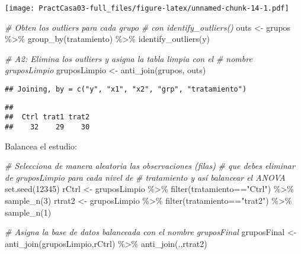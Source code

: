 \documentclass[
]{article}
\newenvironment{Shaded}{}{}
\newcommand{\CommentTok}[1]{\textcolor[rgb]{0.38,0.63,0.69}{\textit{#1}}}
\newcommand{\DecValTok}[1]{\textcolor[rgb]{0.25,0.63,0.44}{#1}}
\newcommand{\FunctionTok}[1]{\textcolor[rgb]{0.02,0.16,0.49}{#1}}
\newcommand{\NormalTok}[1]{#1}
\newcommand{\OtherTok}[1]{\textcolor[rgb]{0.00,0.44,0.13}{#1}}
\newcommand{\SpecialCharTok}[1]{\textcolor[rgb]{0.25,0.44,0.63}{#1}}
\newcommand{\StringTok}[1]{\textcolor[rgb]{0.25,0.44,0.63}{#1}}
\begin{document}
\texttt{[image: PractCasa03-full\_files/figure-latex/unnamed-chunk-14-1.pdf]}

\begin{Shaded}
\begin{Highlighting}[]
\CommentTok{\# Obten los outliers para cada grupo}
\CommentTok{\# con identify\_outliers()}
\NormalTok{outs }\OtherTok{\textless{}{-}}\NormalTok{ grupos }\SpecialCharTok{\%\textgreater{}\%} 
  \FunctionTok{group\_by}\NormalTok{(tratamiento) }\SpecialCharTok{\%\textgreater{}\%} 
  \FunctionTok{identify\_outliers}\NormalTok{(y)}

\CommentTok{\# A2: Elimina los outliers y asigna la tabla limpia con el}
\CommentTok{\# nombre gruposLimpio}
\NormalTok{gruposLimpio }\OtherTok{\textless{}{-}} \FunctionTok{anti\_join}\NormalTok{(grupos, outs)}
\end{Highlighting}
\end{Shaded}

\begin{verbatim}
## Joining, by = c("y", "x1", "x2", "grp", "tratamiento")
\end{verbatim}

\begin{Shaded}
\end{Shaded}

\begin{verbatim}
## 
##  Ctrl trat1 trat2 
##    32    29    30
\end{verbatim}

Balancea el estudio:

\begin{Shaded}
\begin{Highlighting}[]
\CommentTok{\# Selecciona de manera aleatoria las observaciones (filas)}
\CommentTok{\# que debes eliminar de gruposLimpio para cada nivel de }
\CommentTok{\# tratamiento y así balancear el ANOVA}
\FunctionTok{set.seed}\NormalTok{(}\DecValTok{12345}\NormalTok{)}
\NormalTok{rCtrl }\OtherTok{\textless{}{-}}\NormalTok{ gruposLimpio }\SpecialCharTok{\%\textgreater{}\%} \FunctionTok{filter}\NormalTok{(tratamiento}\SpecialCharTok{==}\StringTok{"Ctrl"}\NormalTok{) }\SpecialCharTok{\%\textgreater{}\%} \FunctionTok{sample\_n}\NormalTok{(}\DecValTok{3}\NormalTok{)}
\NormalTok{rtrat2 }\OtherTok{\textless{}{-}}\NormalTok{ gruposLimpio }\SpecialCharTok{\%\textgreater{}\%} \FunctionTok{filter}\NormalTok{(tratamiento}\SpecialCharTok{==}\StringTok{"trat2"}\NormalTok{) }\SpecialCharTok{\%\textgreater{}\%} \FunctionTok{sample\_n}\NormalTok{(}\DecValTok{1}\NormalTok{)}

\CommentTok{\# Asigna la base de datos balanceada con el nombre gruposFinal}
\NormalTok{gruposFinal }\OtherTok{\textless{}{-}} \FunctionTok{anti\_join}\NormalTok{(gruposLimpio,rCtrl) }\SpecialCharTok{\%\textgreater{}\%} \FunctionTok{anti\_join}\NormalTok{(.,rtrat2)}
\end{Highlighting}
\end{Shaded}
\end{document}
